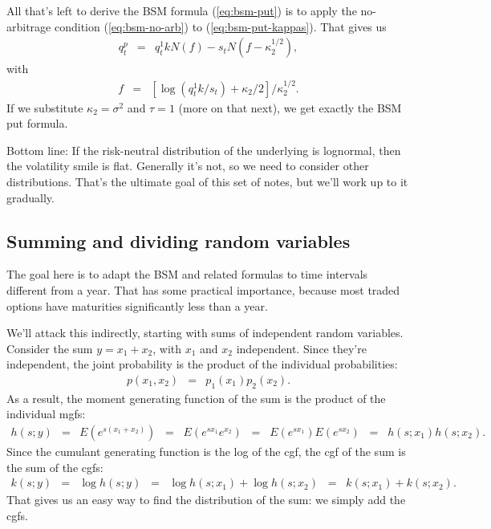 \documentclass[11pt]{article}
\begin{document}
All that's left to derive the BSM formula (\ref{eq:bsm-put})
is to apply the no-arbitrage condition (\ref{eq:bsm-no-arb})
to (\ref{eq:bsm-put-kappas}).
That gives us
\begin{eqnarray}
    q^p_t &=& q^1_t k N (f) - s_t N ( f - \kappa_2^{1/2} ),
    \label{eq:bsm-put-kappas}
\end{eqnarray}
with
\begin{eqnarray*}
    f &=&  [\log (q^1_t k/s_t) + \kappa_2/2]/\kappa_2^{1/2} .
\end{eqnarray*}
If we substitute $\kappa_2 = \sigma^2$ and $\tau = 1$ (more on that next),
we get exactly the BSM put formula.

Bottom line:
If the risk-neutral distribution of the underlying
is lognormal,
then the volatility smile is flat.
Generally it's not,
so we need to consider other distributions.
That's the ultimate goal of this set of notes,
but we'll work up to it gradually.


\subsection*{Summing and dividing random variables}

The goal here is to adapt the BSM and related formulas
to time intervals different from a year.
That has some practical importance, because
most traded options have maturities significantly less than a year.

We'll attack this indirectly, starting with sums
of independent random variables.
Consider the sum $y = x_1 + x_2$, with $x_1$ and $x_2$ independent.
Since they're independent,
the joint probability is the product of the individual probabilities:
\begin{eqnarray*}
    p(x_1,x_2) &=& p_1(x_1) p_2(x_2) .
\end{eqnarray*}
As a result, the moment generating function of the sum
is the product of the individual mgfs:
\begin{eqnarray*}
    h(s; y) &=& E \left( e^{s (x_1 + x_2)} \right)
            \;\;=\;\; E \left( e^{s x_1} e^{x_2} \right)
            \;\;=\;\; E \left( e^{s x_1} \right)
                E \left( e^{s x_2} \right)
            \;\;=\;\; h(s; x_1) h(s; x_2) .
\end{eqnarray*}
Since the cumulant generating function is the log of the cgf,
the cgf of the sum is the sum of the cgfs:
\begin{eqnarray*}
    k(s; y) &=& \log h(s; y)
            \;\;=\;\; \log h(s; x_1) + \log h(s; x_2)
            \;\;=\;\; k(s; x_1) + k(s; x_2) .
\end{eqnarray*}
That gives us an easy way to find the distribution
of the sum:  we simply add the cgfs.
\end{document}
